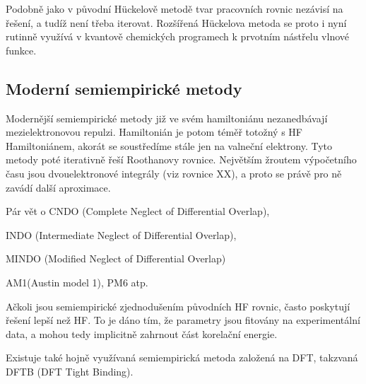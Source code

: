 Podobně jako v původní H\"{u}ckelově metodě tvar pracovních rovnic nezávisí na řešení, a tudíž není třeba iterovat. Rozšířená H\"{u}ckelova metoda se proto i nyní rutinně využívá v kvantově chemických programech k prvotním nástřelu vlnové funkce.

\subsection{Moderní semiempirické metody}

Modernější semiempirické metody již ve svém hamiltoniánu nezanedbávají mezielektronovou repulzi.
Hamiltonián je potom téměř totožný s HF Hamiltoniánem, akorát se soustředíme stále jen na valneční elektrony. Tyto metody poté iterativně řeší Roothanovy rovnice. Největším žroutem výpočetního času jsou dvouelektronové integrály (viz rovnice XX), a proto se právě pro ně zavádí další aproximace.
 
 Pár vět o CNDO (Complete Neglect of Differential Overlap),
 
 INDO (Intermediate Neglect of Differential Overlap),
 
 MINDO (Modified Neglect of Differential Overlap)
 
 AM1(Austin model 1), PM6 atp.

Ačkoli jsou semiempirické zjednodušením původních HF rovnic, často poskytují řešení lepší než HF.
To je dáno tím, že parametry jsou fitovány na experimentální data, a mohou tedy implicitně zahrnout část korelační energie.

Existuje také hojně využívaná semiempirická metoda založená na DFT, takzvaná DFTB (DFT Tight Binding).


 
